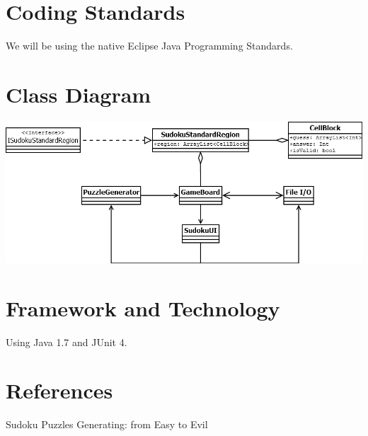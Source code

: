 \documentclass{article}
\begin{document}
\section{Coding Standards}
We will be using the native Eclipse Java Programming Standards. 


\section{Class Diagram}

\begin{center}
\includegraphics[scale=0.5]{ClassDiagram.png}
\end{center}

\section{Framework and Technology}
Using Java 1.7 and JUnit 4.

\section{References}
Sudoku Puzzles Generating: from Easy to Evil
\end{document}
